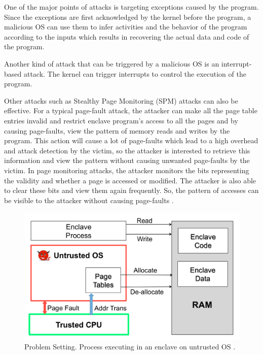 One of the major points of attacks is targeting exceptions caused by the program. Since the exceptions are first acknowledged by the kernel before the program, a malicious OS can use them to infer activities and the behavior of the program according to the inputs which results in recovering the actual data and code of the program.

Another kind of attack that can be triggered by a malicious OS is an interrupt-based attack. The kernel can trigger interrupts to control the execution of the program.

Other attacks such as Stealthy Page Monitoring (SPM) attacks \cite{stealthy,leakycauldron} can also be effective. For a typical page-fault attack, the attacker can make all the page table entries invalid and restrict enclave program’s access to all the pages and by causing page-faults, view the pattern of memory reads and writes by the program. This action will cause a lot of page-faults which lead to a high overhead and attack detection by the victim, so the attacker is interested to retrieve this information and view the pattern without causing unwanted page-faults by the victim. In page monitoring attacks, the attacker monitors the bits representing the validity and whether a page is accessed or modified. The attacker is also able to clear these bits and view them again frequently. So, the pattern of accesses can be visible to the attacker without causing page-faults \cite{stealthy,leakycauldron}.


\begin{figure}
	\includegraphics[scale=0.2]{images/uos1}
	\caption{Problem Setting. Process executing in an enclave on untrusted OS \cite{pigeonhole}.}
	\label{fig:uos}
\end{figure}


